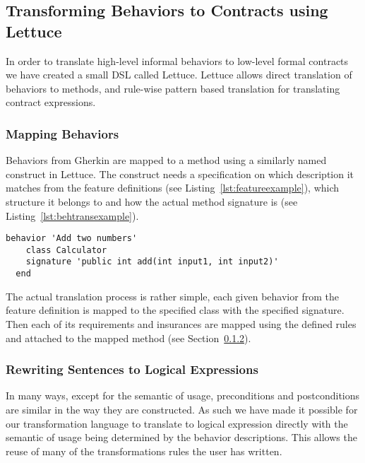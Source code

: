 \subsection{Transforming Behaviors to Contracts using Lettuce}
\label{sub:Transforming Behaviors to Contracts using Lettuce}


In order to translate high-level informal behaviors to low-level formal
contracts we have created a small DSL called Lettuce.
Lettuce allows direct translation of behaviors to methods,
and rule-wise pattern based translation for translating contract expressions.

\subsubsection{Mapping Behaviors}
\label{sub:Mapping Behaviors}

Behaviors from Gherkin are mapped to a method using a similarly named
construct in Lettuce. The construct needs a specification on which
description it matches from the feature definitions (see Listing~\ref{lst:featureexample}),
which structure it belongs to and how the actual method signature is
(see Listing~\ref{lst:behtransexample}).

\begin{lstlisting}[caption={General Behavior Description of Adding Natural Numbers},label={lst:behtransexample}]
  behavior 'Add two numbers'
    class Calculator
    signature 'public int add(int input1, int input2)'
  end
\end{lstlisting}

The actual translation process is rather simple,
each given behavior from the feature definition is mapped to the
specified class with the specified signature. Then each of its requirements
and insurances are mapped using the defined rules and attached to the mapped
method (see Section~\ref{sub:RewritingSentencestoLogicalExpressions}).

\subsubsection{Rewriting Sentences to Logical Expressions}
\label{sub:RewritingSentencestoLogicalExpressions}

In many ways, except for the semantic of usage,
preconditions and postconditions are similar in the way they are constructed.
As such we have made it possible for our transformation language to translate
to logical expression directly with the semantic of usage being determined by
the behavior descriptions. 
This allows the reuse of many of the transformations rules the user has written.


